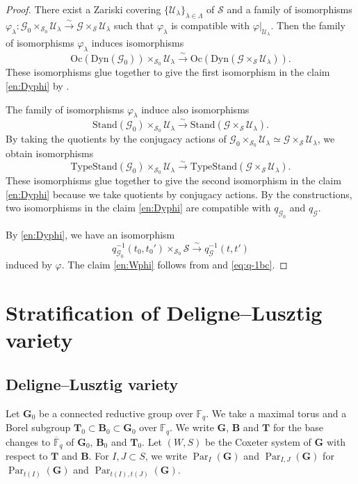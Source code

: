 \documentclass[12pt,a4paper]{article}
\DeclareMathOperator{\Par}{Par}
\newcommand{\bF}{\mathbb{F}}
\newcommand{\bfB}{\mathbf{B}}
\newcommand{\bfG}{\mathbf{G}}
\newcommand{\bfT}{\mathbf{T}}
\newcommand{\sG}{\mathscr{G}}
\newcommand{\sS}{\mathscr{S}}
\newcommand{\sU}{\mathscr{U}}
\newcommand{\ol}{\overline}
\begin{document}
\begin{proof}
There exist a Zariski covering $\{ \sU_{\lambda} \}_{\lambda \in \Lambda}$ of $\sS$ and 
a family of isomorphisms $\varphi_{\lambda} \colon \sG_0 \times_{\sS_0} \sU_{\lambda} \xrightarrow{\sim} \sG \times_{\sS} \sU_{\lambda}$ such that 
$\varphi_{\lambda}$ is compatible with 
$\varphi|_{\sU_{\lambda}}$.  
Then the family of isomorphisms $\varphi_{\lambda}$ 
induces isomorphisms 
\[
 \mathrm{Oc}(\mathrm{Dyn}(\sG_0)) \times_{\sS_0} \sU_{\lambda} \xrightarrow{\sim}  \mathrm{Oc}(\mathrm{Dyn}(\sG \times_{\sS} \sU_{\lambda})). 
\]
These isomorphisms glue together to give the first isomorphism in the claim \ref{en:Dyphi} by \cite[XXIV, 3.4 (iv)]{SGA3-3}. 

The family of isomorphisms $\varphi_{\lambda}$ 
induce also isomorphisms 
\[
 \mathrm{Stand}(\sG_0) \times_{\sS_0} \sU_{\lambda} \xrightarrow{\sim}  \mathrm{Stand}(\sG \times_{\sS} \sU_{\lambda}). 
\]
By taking the quotients by the conjugacy actions of 
$\sG_0 \times_{\sS_0} \sU_{\lambda} \simeq  \sG \times_{\sS} \sU_{\lambda}$, we obtain 
isomorphisms 
\[
 \mathrm{TypeStand}(\sG_0) \times_{\sS_0} \sU_{\lambda} \xrightarrow{\sim}  \mathrm{TypeStand}(\sG \times_{\sS} \sU_{\lambda}). 
\]
These isomorphisms glue together to give the second isomorphism in the claim \ref{en:Dyphi} 
because we take quotients by conjugacy actions. 
By the constructions, two isomorphisms in 
the claim \ref{en:Dyphi} 
are compatible with $q_{\sG_0}$ and $q_{\sG}$. 

By \ref{en:Dyphi}, we have an isomorphism 
\begin{equation}\label{eq:q-1bc}
 q_{\sG_0}^{-1}(t_0,t_0') \times_{\sS_0} \sS \xrightarrow{\sim} 
 q_{\sG}^{-1}(t,t') 
\end{equation}
induced by $\varphi$. 
The claim \ref{en:Wphi} follows from \cite[XXII, Proposition 3.4]{SGA3-3} and \eqref{eq:q-1bc}. 
\end{proof}

\section{Stratification of Deligne--Lusztig variety}\label{sec:StDL}
\subsection{Deligne--Lusztig variety}
Let $\bfG_0$ be a connected reductive group over $\bF_q$. 
We take a maximal torus and a Borel subgroup 
$\bfT_0 \subset \bfB_0 \subset \bfG_0$ over $\bF_q$. 
We write 
$\bfG$, $\bfB$ and $\bfT$ for the base changes to 
$\ol{\bF}_q$ of $\bfG_0$, $\bfB_0$ and $\bfT_0$. 
Let $(W,S)$ be the Coxeter system of $\bfG$ with respect to $\bfT$ and $\bfB$. 
For $I, J \subset S$, we write 
$\Par_I (\bfG)$ and $\Par_{I,J} (\bfG)$ 
for 
$\Par_{t(I)} (\bfG)$ and $\Par_{t(I),t(J)} (\bfG)$. 
\end{document}
